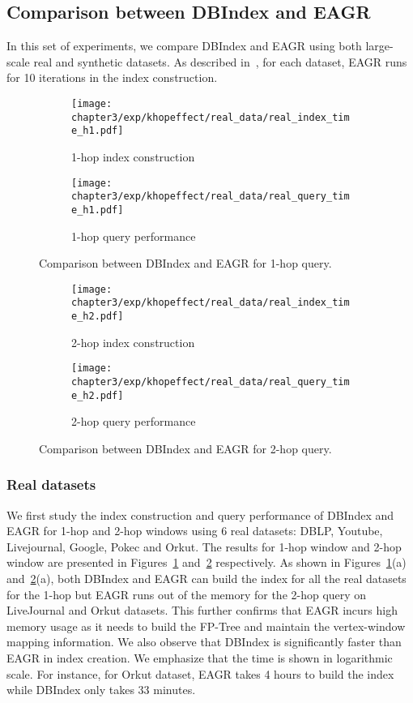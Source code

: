 \subsection{Comparison between DBIndex and EAGR}

In this set of experiments, we compare DBIndex and 
EAGR \cite{mondal2014eagr} using both large-scale real 
and synthetic datasets. As described in~\cite{mondal2014eagr},
for each dataset, EAGR runs for 10 
iterations in the index construction.

\begin{figure}[h]
\centering
\begin{subfigure}{0.45\linewidth}
  \centering
  \texttt{[image: chapter3/exp/khopeffect/real\_data/real\_index\_time\_h1.pdf]}
  \caption{1-hop index construction}
\end{subfigure} \begin{subfigure}{0.45\linewidth}
  \centering
  \texttt{[image: chapter3/exp/khopeffect/real\_data/real\_query\_time\_h1.pdf]}
  \caption{1-hop query performance}
\end{subfigure}%
\caption{Comparison between DBIndex and EAGR  for 1-hop query.}
\label{fig:1-hop-real}
\end{figure}

\begin{figure}[h]
\centering
\begin{subfigure}{0.45\linewidth}
  \centering
  \texttt{[image: chapter3/exp/khopeffect/real\_data/real\_index\_time\_h2.pdf]}
  \caption{2-hop index construction}
\end{subfigure}
\begin{subfigure}{0.45\linewidth}
  \centering
  \texttt{[image: chapter3/exp/khopeffect/real\_data/real\_query\_time\_h2.pdf]}
  \caption{2-hop query performance}
\end{subfigure}
\caption{Comparison between DBIndex and EAGR for 2-hop query.}
\label{fig:2-hop-real}
\end{figure}

\subsubsection{Real datasets} 
We first study the index construction and 
query performance of DBIndex and EAGR for 1-hop and 2-hop windows 
using 6 real datasets: DBLP, Youtube, Livejournal, Google, Pokec and Orkut. 
The results for 1-hop window and 2-hop window are presented
in Figures~\ref{fig:1-hop-real} and~\ref{fig:2-hop-real} 
respectively. 
As shown in Figures~\ref{fig:1-hop-real}(a) and~\ref{fig:2-hop-real}(a), both DBIndex and EAGR can build the index for all
the real datasets for the 1-hop but EAGR runs out of the memory for the 2-hop query on LiveJournal and Orkut datasets. This further confirms that EAGR incurs 
high memory usage as it needs to build the FP-Tree and 
maintain the vertex-window mapping information. We also observe that 
DBIndex is significantly faster than EAGR in index creation. 
We emphasize that the time is shown in logarithmic scale. 
For instance, for Orkut dataset, EAGR takes 4 hours to build the index 
while DBIndex only takes 33 minutes. 

